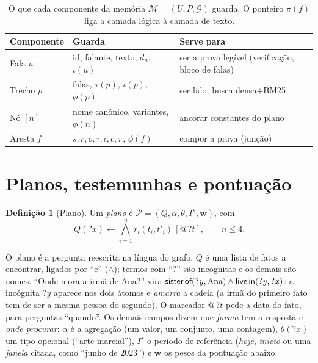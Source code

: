 \documentclass[10pt,twocolumn]{article}
\theoremstyle{definition}
\newtheorem{definicao}{Definição}
\newcommand{\rel}[1]{\textsf{#1}}
\newcommand{\V}[1]{\mathord{?}\mathit{#1}}
\newcommand{\M}{\mathcal{M}}
\newcommand{\G}{\mathcal{G}}
\newcommand{\Pl}{\mathcal{P}}
\begin{document}
\begin{table}[t]
\centering\small
\setlength{\tabcolsep}{3pt}
\begin{tabularx}{\columnwidth}{@{}l Y Y@{}}
\toprule
Componente & Guarda & Serve para \\
\midrule
Fala $u$ & id, falante, texto, $d_u$, $\iota(u)$ & ser a prova legível (verificação, bloco de falas) \\
Trecho $p$ & falas, $\tau(p)$, $\iota(p)$, $\phi(p)$ & ser lido; busca densa+BM25 \\
Nó $[n]$ & nome canônico, variantes, $\phi(n)$ & ancorar constantes do plano \\
Aresta $f$ & $s,r,o,\tau,\iota,c,\pi$, $\phi(f)$ & compor a prova (junção) \\
\bottomrule
\end{tabularx}
\caption{O que cada componente da memória $\M=(U,P,\G)$ guarda. O ponteiro
$\pi(f)$ liga a camada lógica à camada de texto.}
\label{tab:mem}
\vspace{-3mm}
\end{table}

\section{Planos, testemunhas e pontuação}
\label{sec:plano}

\begin{definicao}[Plano]
Um \emph{plano} é $\Pl=(Q,\alpha,\theta,I^\star,\mathbf w)$, com
\begin{equation*}
Q(\V x)\leftarrow \textstyle\bigwedge_{i=1}^{n} r_i(t_i,t'_i)\,[@\,\V t],\qquad n\le4.
\end{equation*}
\end{definicao}

O plano é a pergunta reescrita na língua do grafo. $Q$ é uma lista de fatos a
encontrar, ligados por ``e'' ($\wedge$); termos com ``?'' são incógnitas e os
demais são nomes. ``Onde mora a irmã de Ana?'' vira
$\rel{sister\,of}(\V y,\text{Ana})\wedge\rel{live\,in}(\V y,\V x)$: a
incógnita $\V y$ aparece nos dois átomos e \emph{amarra} a cadeia (a irmã do
primeiro fato tem de ser a mesma pessoa do segundo). O marcador $@\,\V t$ pede
a data do fato, para perguntas ``quando''. Os demais campos dizem que
\emph{forma} tem a resposta e \emph{onde procurar}: $\alpha$ é a agregação
(um valor, um conjunto, uma contagem), $\theta(\V x)$ um tipo opcional
(``arte marcial''), $I^\star$ o período de referência (\emph{hoje},
\emph{início} ou uma \emph{janela} citada, como ``junho de 2023'') e
$\mathbf w$ os pesos da pontuação abaixo.
\end{document}
